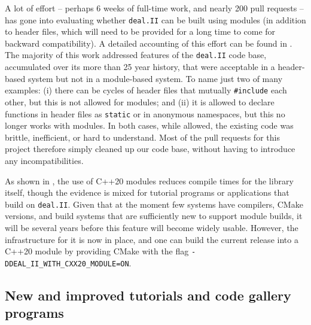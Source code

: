 \documentclass{ansarticle-preprint}
\newcommand{\specialword}[1]{\texttt{#1}}
\newcommand{\dealii}{{\specialword{deal.II}}\xspace}
\begin{document}
A lot of effort -- perhaps 6 weeks of full-time work, and nearly 200
pull requests -- has gone into evaluating whether \dealii{} can be
built using modules (in addition to header files, which will need to
be provided for a long time to come for backward compatibility). A
detailed accounting of this effort can be found in
\cite{bangerth2025experienceconvertinglargemathematical}. The majority
of this work addressed features of the \dealii{} code base,
accumulated over its more than 25 year history, that were acceptable
in a header-based system but not in a module-based system. To name
just two of many examples: (i) there can be cycles of header files that mutually
\texttt{\#include} each other, but this is not allowed for
modules; and (ii) it is allowed to declare functions in header files
as \texttt{static} or in anonymous namespaces, but this no longer
works with modules. In both cases, while allowed, the existing code
was brittle, inefficient, or hard to understand. Most of the pull requests for this project therefore simply
cleaned up our code base, without having to introduce any
incompatibilities.

As shown in \cite{bangerth2025experienceconvertinglargemathematical},
the use of C++20 modules
reduces compile times for the library itself, though the evidence is
mixed for tutorial programs or applications that build on
\dealii{}. Given that at the moment few systems have compilers, CMake
versions, and build systems that are sufficiently new to support
module builds, it will be several years before this feature will
become widely usable. However, the infrastructure for it is now
in place, and one can build the current release into a C++20 module by
providing CMake with the flag \texttt{-DDEAL\_II\_WITH\_CXX20\_MODULE=ON}.



\subsection{New and improved tutorials and code gallery programs}
\label{subsec:steps}
\end{document}
